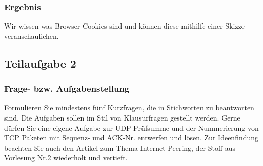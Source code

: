 \subsubsection{Ergebnis}
Wir wissen was Browser-Cookies sind und können diese mithilfe einer Skizze veranschaulichen.

\subsection{Teilaufgabe 2}

\subsubsection{Frage- bzw. Aufgabenstellung}
Formulieren Sie mindestens fünf Kurzfragen, die in Stichworten zu beantworten sind. Die Aufgaben sollen im Stil von Klausurfragen gestellt werden. Gerne dürfen Sie eine eigene Aufgabe zur UDP Prüfsumme und der Nummerierung von TCP Paketen mit Sequenz- und ACK-Nr. entwerfen und lösen. Zur Ideenfindung beachten Sie auch den Artikel zum Thema Internet Peering, der Stoff aus Vorlesung Nr.2 wiederholt und vertieft.


